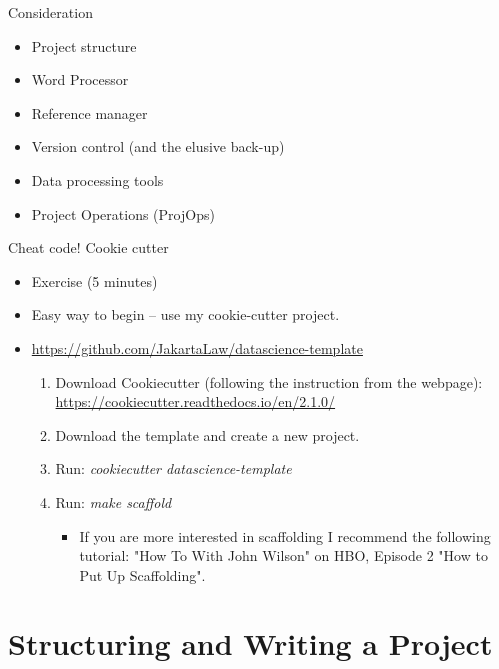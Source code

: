 \documentclass{beamer}
\begin{document}
\begin{frame}{Consideration}
\begin{itemize}
    \item Project structure
    \item Word Processor
    \item Reference manager
    \item Version control (and the elusive back-up)
    \item Data processing tools
    \item Project Operations (ProjOps)
\end{itemize}
\end{frame}

\begin{frame}{Cheat code! Cookie cutter}
\begin{itemize}
    \item Exercise (5 minutes)
    \item Easy way to begin – use my cookie-cutter project.
    \item \url{https://github.com/JakartaLaw/datascience-template}
    \begin{enumerate}
        \item Download Cookiecutter (following the instruction from the webpage): \url{https://cookiecutter.readthedocs.io/en/2.1.0/}
        \item Download the template and create a new project.
        \item Run: \textit{cookiecutter datascience-template}
        \item Run: \textit{make scaffold}
        \begin{itemize}
            \item If you are more interested in scaffolding I recommend the following tutorial: "How To With John Wilson" on HBO, Episode 2 "How to Put Up Scaffolding".
        \end{itemize}
    \end{enumerate}
\end{itemize}
    
\end{frame}

\section{Structuring and Writing a Project}
\end{document}

